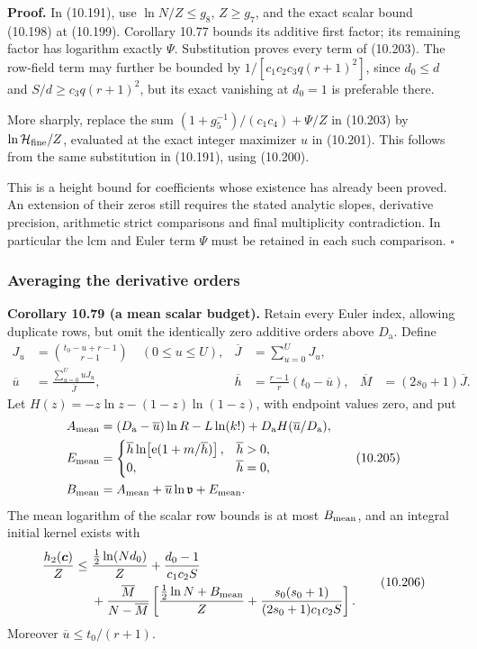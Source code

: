 \documentclass[
  11pt,
  a4paper,
]{article}
\begin{document}
\textbf{Proof.} In (10.191), use \(\ln N/Z\le g_8\), \(Z\ge g_7\), and
the exact scalar bound (10.198) at (10.199). Corollary 10.77 bounds its
additive first factor; its remaining factor has logarithm exactly
\(\Psi\). Substitution proves every term of (10.203). The row-field term
may further be bounded by \(1/[c_1c_2c_3q(r+1)^2]\), since \(d_0\le d\)
and \(S/d\ge c_3q(r+1)^2\), but its exact vanishing at \(d_0=1\) is
preferable there.

More sharply, replace the sum \((1+g_5^{-1})/(c_1c_4)+\Psi/Z\) in
(10.203) by \(\ln\mathcal H_{\rm fine}/Z\), evaluated at the exact
integer maximizer \(\widehat u\) in (10.201). This follows from the same
substitution in (10.191), using (10.200).

This is a height bound for coefficients whose existence has already been
proved. An extension of their zeros still requires the stated analytic
slopes, derivative precision, arithmetic strict comparisons and final
multiplicity contradiction. In particular the lcm and Euler term
\(\Psi\) must be retained in each such comparison. \(\square\)

\subsubsection{Averaging the derivative
orders}\label{averaging-the-derivative-orders}

\textbf{Corollary 10.79 (a mean scalar budget).} Retain every Euler
index, allowing duplicate rows, but omit the identically zero additive
orders above \(D_{\mathrm a}\). Define \[
\begin{aligned}
J_u&=\binom{t_0-u+r-1}{r-1}\quad(0\le u\le U),&
\overline J&=\sum_{u=0}^U J_u,\\
\overline u&=\frac{\sum_{u=0}^UuJ_u}{\overline J},&
\overline h&=\frac{r-1}{r}(t_0-\overline u),&
\overline M&=(2s_0+1)\overline J.
\end{aligned}
\tag{10.204}
\] Let \(H(z)=-z\ln z-(1-z)\ln(1-z)\), with endpoint values zero, and
put \[
\begin{aligned}
A_{\rm mean}&=(D_{\mathrm a}-\overline u)\ln R
-L\ln(k!)+D_{\mathrm a}H(\overline u/D_{\mathrm a}),\\
E_{\rm mean}&=\begin{cases}
\overline h\ln\!\left[\mathrm e(1+m/\overline h)\right],&\overline h>0,\\
0,&\overline h=0,
\end{cases}\\
B_{\rm mean}&=A_{\rm mean}+\overline u\ln\mathfrak v+E_{\rm mean}.
\end{aligned}
\tag{10.205}
\] The mean logarithm of the scalar row bounds is at most
\(B_{\rm mean}\), and an integral initial kernel exists with \[
\begin{aligned}
\frac{h_2(\boldsymbol c)}Z\le{}&
\frac{\tfrac12\ln(Nd_0)}Z+\frac{d_0-1}{c_1c_2S}\\
&+\frac{\overline M}{N-\overline M}
\left[\frac{\tfrac12\ln N+B_{\rm mean}}Z
+\frac{s_0(s_0+1)}
{(2s_0+1)c_1c_2S}\right].
\end{aligned}
\tag{10.206}
\] Moreover \(\overline u\le t_0/(r+1)\).
\end{document}

